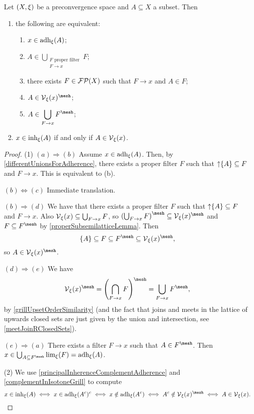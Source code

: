\begin{proposition} \label{principalAdherenceInherence}
Let $\sSet{X,\xi}$ be a preconvergence space and $A\subseteq X$ a subset. Then
\begin{enumerate}
\item the following are equivalent:
\begin{enumerate}
\item $x\in \operatorname{adh}_\xi(A)$;
\item $\displaystyle A \in \bigcup_{\substack{\text{$F$ proper filter} \\F\to x}} F$;
\item there exists $F\in\operatorname{\mathcal{FP}}(X)$ such that $F\to x$ and $A\in F$;
\item $A\in \vicinity_\xi(x)^{\mesh}$;
\item $\displaystyle A \in \bigcup_{F\to x} F^{\mesh}$;
\end{enumerate}
\item $x\in \operatorname{inh}_\xi(A)$ \textup{if and only if} $A\in \operatorname{\mathcal{V}}_\xi(x)$.
\end{enumerate}
\end{proposition}
\begin{proof}
(1) $(a) \Rightarrow (b)$ Assume $x\in \operatorname{adh}_\xi(A)$. Then, by \ref{differentUnionsForAdherence}, there exists a proper filter $F$ such that $\operatorname{\uparrow}\{A\}\subseteq F$ and $F\to x$. This is equivalent to (b).

$(b) \Leftrightarrow (c)$ Immediate translation.

$(b) \Rightarrow (d)$ We have that there exists a proper filter $F$ such that $\operatorname{\uparrow}\{A\}\subseteq F$ and $F\to x$. Also $\operatorname{\mathcal{V}}_\xi(x)\subseteq \bigcup_{F\to x} F$, so $\left(\bigcup_{F\to x} F\right)^\mesh \subseteq \vicinity_\xi(x)^\mesh$ and $F\subseteq F^\mesh$ by \ref{properSubsemilatticeLemma}. Then
\[ \{A\} \subseteq F\subseteq F^\mesh\subseteq \vicinity_\xi(x)^\mesh, \]
so $A\in \vicinity_\xi(x)^\mesh$.

$(d) \Rightarrow (e)$ We have
\[ \vicinity_\xi(x)^\mesh = \left(\bigcap_{F\to x} F\right)^\mesh = \bigcup_{F\to x}F^\mesh, \]
by \ref{grillUpsetOrderSimilarity} (and the fact that joins and meets in the lattice of upwards closed sets are just given by the union and intersection, see \ref{meetJoinRClosedSets}).

$(e) \Rightarrow (a)$ There exists a filter $F\to x$ such that $A\in F^\mesh$. Then $x\in \bigcup_{A\subseteq F^\mesh}\lim_\xi(F) = \adh_\xi(A)$.

(2) We use \ref{principalInherenceComplementAdherence} and \ref{complementInIsotoneGrill} to compute
\[ x\in \inh_\xi(A) \iff x\in \adh_\xi(A^c)^c \iff x\notin \adh_\xi(A^c) \iff A^c\notin \vicinity_\xi(x)^\mesh \iff A\in \vicinity_\xi(x). \]
\end{proof}
